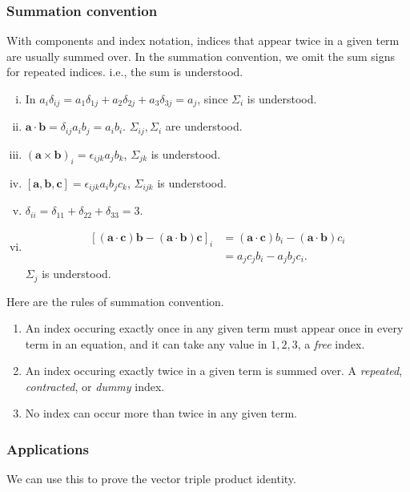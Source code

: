 \documentclass[a4paper]{article}
\begin{document}
\subsubsection{Summation convention}
With components and index notation, indices that appear twice in a
given term are usually summed over. In the summation convention, we
omit the sum signs for repeated indices. i.e., the sum is understood.
\begin{example}
  \begin{enumerate}[(i)]
    \item In $ a_i \delta_{ij} = a_1\delta_{1j}+a_2\delta_{2j}+a_3
      \delta_{3j}=a_j $, since $ \Sigma_{i} $ is understood.
    \item $ \mathbf{a}\cdot \mathbf{b}=\delta_{ij}a_{i}b_{j}=a_ib_i
      $. $ \Sigma_{ij}, \Sigma_{i} $ are understood.
    \item $ (\mathbf{a}\times \mathbf{b})_i=\epsilon_{ijk}a_jb_k $, $
      \Sigma_{jk} $ is understood.
    \item $
      [\mathbf{a},\mathbf{b},\mathbf{c}]=\epsilon_{ijk}a_ib_jc_k $, $
      \Sigma_{ijk} $ is understood.
    \item $ \delta_{ii}=\delta_{11}+\delta_{22}+\delta_{33}=3 $.
    \item
      \[
        \begin{aligned}
          [(\mathbf{a}\cdot \mathbf{c})\mathbf{b}-(\mathbf{a}\cdot
          \mathbf{b})\mathbf{c}]_i&=(\mathbf{a}\cdot
          \mathbf{c})b_i-(\mathbf{a}\cdot \mathbf{b})c_i\\
          &= a_jc_jb_i-a_jb_jc_i.
        \end{aligned}
      \]
      $ \Sigma_j $ is understood.
  \end{enumerate}
\end{example}
Here are the rules of summation convention.
\begin{enumerate}[(1)]
  \item An index occuring exactly once in any given term must appear
    once in every term in an equation, and it can take any value in $
    1,2,3 $, a \textit{free} index.
  \item An index occuring exactly twice in a given term is summed
    over. A \textit{repeated}, \textit{contracted}, or \textit{dummy} index.
  \item No index can occur more than twice in any given term.
\end{enumerate}
\subsubsection{Applications}
We can use this to prove the vector triple product identity.
\end{document}
